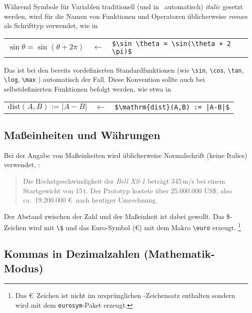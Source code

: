 Während Symbole für Variablen traditionell (und in \latex\ automatisch)
\emph{italic} gesetzt werden, wird für die Namen von Funktionen und
Operatoren üblicherweise \emph{roman} als Schrifttyp verwendet, wie \zB in
%
\begin{center}
	\begin{tabular}{lcl}
		$\sin \theta = \sin(\theta + 2 \pi)$ &
		$\leftarrow$ & \verb!$\sin \theta = \sin(\theta + 2 \pi)$! \\
	\end{tabular}
\end{center}
%
Das ist bei den bereits vordefinierten Standardfunktionen (wie \verb!\sin!,
\verb!\cos!, \verb!\tan!, \verb!\log!, \verb!\max! \uva) automatisch der Fall.
Diese Konvention sollte auch bei selbstdefinierten Funktionen befolgt werden,
wie etwa in
%
\begin{center}
	\begin{tabular}{lcl}
	$\mathrm{dist}(A,B) := |A-B|$ & $\leftarrow$ & 
	\verb!$\mathrm{dist}(A,B) := |A-B|$! \\
	\end{tabular}
\end{center}


\subsection{Maßeinheiten und Währungen}

Bei der Angabe von Maßeinheiten wird üblicherweise Normalschrift (keine
Italics) verwendet, \zB:
%
\begin{quote}
	Die Höchstgeschwindigkeit der \textit{Bell XS-1} beträgt 345\,m/s bei
	einem Startgewicht von 15\,t. Der Prototyp kostete über 25.000.000 US\$,
	also ca.\ 19.200.000 \euro\ nach heutiger Umrechnung.
\end{quote}
%
Der Abstand zwischen der Zahl und der Maßeinheit ist dabei gewollt. Das
\$-Zeichen wird mit \verb!\$! und das Euro-Symbol (\euro) mit dem Makro
\verb!\euro! erzeugt.%
\footnote{Das \euro\ Zeichen ist nicht im ursprünglichen \latex-Zeichensatz
enthalten sondern wird mit dem \texttt{eurosym}-Paket erzeugt.}


\subsection{Kommas in Dezimalzahlen (Mathematik-Modus)}


